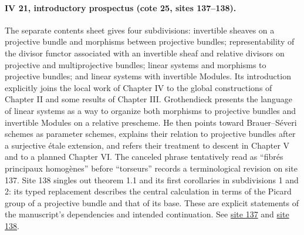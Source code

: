 \documentclass[10pt,a4paper]{article}
\begin{document}
\par{}
\paragraph{IV 21, introductory prospectus (cote 25, sites 137--138).}
The separate contents sheet gives four subdivisions: invertible sheaves on a projective bundle and morphisms between projective bundles; representability of the divisor functor associated with an invertible sheaf and relative divisors on projective and multiprojective bundles; linear systems and morphisms to projective bundles; and linear systems with invertible Modules. Its introduction explicitly joins the local work of Chapter IV to the global constructions of Chapter II and some results of Chapter III. Grothendieck presents the language of linear systems as a way to organize both morphisms to projective bundles and invertible Modules on a relative prescheme. He then points toward Brauer--Séveri schemes as parameter schemes, explains their relation to projective bundles after a surjective étale extension, and refers their treatment to descent in Chapter V and to a planned Chapter VI. The canceled phrase tentatively read as ``fibrés principaux homogènes'' before ``torseurs'' records a terminological revision on site 137. Site 138 singles out theorem 1.1 and its first corollaries in subdivisions 1 and 2: its typed replacement describes the central calculation in terms of the Picard group of a projective bundle and that of its base. These are explicit statements of the manuscript's dependencies and intended continuation. See \href{https://grothendieck.umontpellier.fr/web/viewer.html?file=../25.pdf#page=138}{site 137} and \href{https://grothendieck.umontpellier.fr/web/viewer.html?file=../25.pdf#page=139}{site 138}.
\par{}

\par{}
\end{document}
